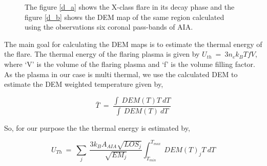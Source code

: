 \documentclass[a4paper,11pt]{article}
\begin{document}
\begin{figure}[h!]
    \centering
    \caption{The figure \ref{d_a} shows the X-class flare in its decay phase and the figure \ref{d_b} shows the DEM map of the same region calculated using the observations six coronal pass-bands of AIA.}
    \label{fig:dem}
\end{figure}

The main goal for calculating the DEM maps is to estimate the thermal energy of the flare. The thermal energy of the flaring plasma is given by $U_{th}~=~3n_{e}k_{B}TfV$, where `V' is the volume of the flaring plasma and `f' is the volume filling factor. As the plasma in our case is multi thermal, we use the calculated DEM to estimate the DEM weighted temperature given by, 

\begin{equation*}
    \bar{T}~=~\frac{\int~DEM(T)T~dT}{\int~DEM(T)~dT}
\end{equation*}

So, for our purpose the the thermal energy is estimated by, 

\begin{equation}
    U_{Th}~=~\sum_{j}~\frac{3k_{B}A_{AIA}\sqrt{LOS_{j}}}{\sqrt{EM_{j}}}\int_{T_{min}}^{T_{max}}~DEM(T)_{j}T~dT
\end{equation}
\end{document}
